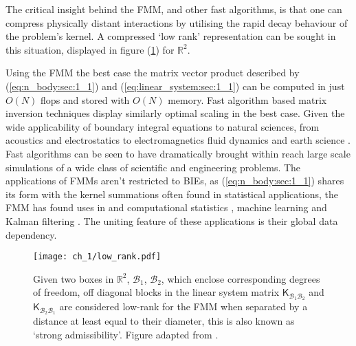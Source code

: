 The critical insight behind the FMM, and other fast algorithms, is that one can compress physically distant interactions by utilising the rapid decay behaviour of the problem's kernel. A compressed `low rank' representation can be sought in this situation, displayed in figure (\ref{fig:low_rank:sec_1_1}) for $\mathbb{R}^2$.

Using the FMM the best case the matrix vector product described by (\ref{eq:n_body:sec:1_1}) and (\ref{eq:linear_system:sec:1_1}) can be computed in just $O(N)$ \gls{flops} and stored with $O(N)$ memory. Fast algorithm based matrix inversion techniques display similarly optimal scaling in the best case. Given the wide applicability of boundary integral equations to natural sciences, from acoustics \cite{wolf2011aeroacoustic,hao2015efficient} and electrostatics \cite{wang2021high} to electromagnetics \cite{darve2004fast} fluid dynamics \cite{rahimian2010petascale} and earth science \cite{chaillat2008multi}. Fast algorithms can be seen to have dramatically brought within reach large scale simulations of a wide class of scientific and engineering problems. The applications of FMMs aren't restricted to BIEs, as (\ref{eq:n_body:sec:1_1}) shares its form with the kernel summations often found in statistical applications, the FMM has found uses in and computational statistics \cite{ambikasaran2013large}, machine learning \cite{lee2012distributed} and Kalman filtering \cite{li2014kalman}. The uniting feature of these applications is their global data dependency. 

\begin{figure}
    \centering
    \texttt{[image: ch\_1/low\_rank.pdf]}
    \caption{Given two boxes in $\mathbb{R}^2$, $\mathcal{B}_1$, $\mathcal{B}_2$, which enclose corresponding degrees of freedom, off diagonal blocks in the linear system matrix $\mathsf{K}_{\mathcal{B}_1\mathcal{B}_2}$ and $\mathsf{K}_{\mathcal{B}_2\mathcal{B}_1}$ are considered low-rank for the FMM when separated by a distance at least equal to their diameter, this is also known as `strong admissibility'. Figure adapted from \cite{minden2017recursive}.}
    \label{fig:low_rank:sec_1_1}
\end{figure}

